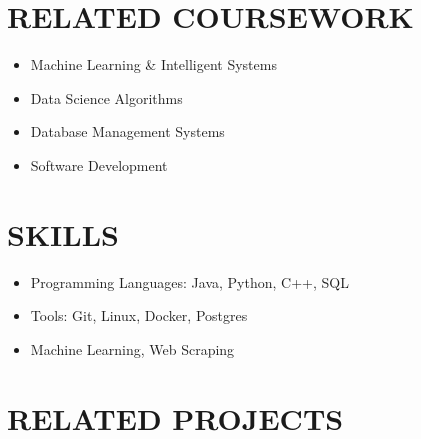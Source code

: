 \documentclass[11pt, a4paper, roman]{moderncv}
\newcommand{\project}[5]{
	\textbf{#1}
	$|$ #3 
	\hfill\textit{#4}
	#5
	\vspace{2mm}
}
\begin{document}

\section{RELATED COURSEWORK}
{\begin{itemize}
    \item Machine Learning \& Intelligent Systems
    \item Data Science Algorithms
    \item Database Management Systems
    \item Software Development
  \end{itemize}
} 

\section{SKILLS}
{\begin{itemize}
	\item Programming Languages: Java, Python, C++, SQL
	\item Tools: Git, Linux, Docker, Postgres
	\item Machine Learning, Web Scraping

\end{itemize}
}

\section{RELATED PROJECTS}

\end{document}
